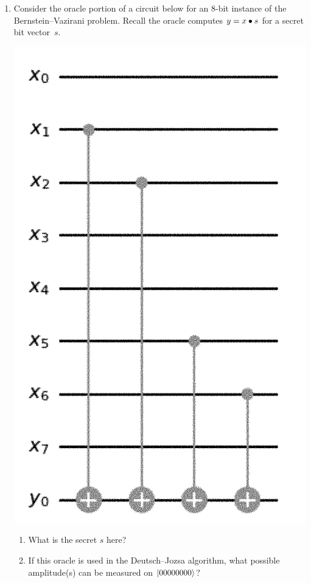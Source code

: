 \documentclass[12pt]{article}
\begin{document}
\begin{enumerate}[font=\bfseries]
    \item {} Consider the oracle portion of a circuit below for an $8$-bit instance of the Bernstein--Vazirani problem.  Recall the oracle computes $y=x\bullet{}s$ for a secret bit vector~$s$.
 \begin{center}   
    \includegraphics[scale=0.45]{ps250-assets/bv.png}
    \end{center}
\begin{enumerate}[label=\theenumi.\arabic*]
\item What is the secret $s$ here? \Blank[2in]{}
    \item If this oracle is used in the Deutsch--Jozsa algorithm, what possible amplitude(s) can be measured on $\ket{00000000}$?
    

\end{enumerate}
\end{enumerate}
\end{document}
